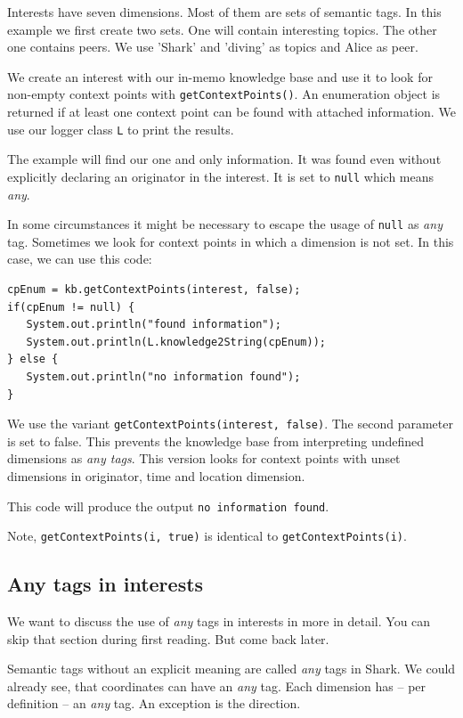 Interests have seven dimensions. Most of them are sets of semantic tags. In this example we first create two sets. One will contain interesting topics. The other one contains peers. We use 'Shark' and 'diving' as topics and Alice as peer.

We create an interest with our in-memo knowledge base and use it to look for non-empty context points with {\tt getContextPoints()}. An enumeration object is returned if at least one context point can be found with attached information.
We use our logger class {\tt L} to print the results. 

The example will find our one and only information. It was found even without explicitly declaring an originator in the interest. It is set to {\tt null} which means {\it any}. 

In some circumstances it might be necessary to escape the usage of {\tt null} as {\it any} tag. Sometimes we look for context points in which a dimension is not set. In this case, we can use this code:

\begin{verbatim}
cpEnum = kb.getContextPoints(interest, false);
if(cpEnum != null) {
   System.out.println("found information");
   System.out.println(L.knowledge2String(cpEnum));
} else {
   System.out.println("no information found");
}
\end{verbatim}

We use the variant {\tt getContextPoints(interest, false)}. The second parameter is set to false. This prevents the knowledge base from interpreting undefined dimensions as {\it any tags}. This version looks for context points with unset dimensions in originator, time and location dimension.

This code will produce the output {\tt no information found}.

Note, {\tt getContextPoints(i, true)} is identical to {\tt getContextPoints(i)}.

\subsection{Any tags in interests}
We want to discuss the use of {\it any} tags in interests in more in detail. You can skip that section during first reading. But come back later. 

Semantic tags without an explicit meaning are called {\it any} tags in Shark.
We could already see, that coordinates can have an {\it any} tag. Each dimension has -- per definition -- an {\it any} tag. An exception is the direction.

